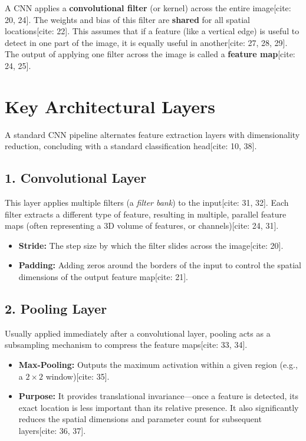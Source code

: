 \begin{definition}
A CNN applies a \textbf{convolutional filter} (or kernel) across the entire image[cite: 20, 24]. The weights and bias of this filter are \textbf{shared} for all spatial locations[cite: 22]. This assumes that if a feature (like a vertical edge) is useful to detect in one part of the image, it is equally useful in another[cite: 27, 28, 29]. The output of applying one filter across the image is called a \textbf{feature map}[cite: 24, 25].
\end{definition}

\section*{Key Architectural Layers}

A standard CNN pipeline alternates feature extraction layers with dimensionality reduction, concluding with a standard classification head[cite: 10, 38].

\subsection*{1. Convolutional Layer}
This layer applies multiple filters (a \textit{filter bank}) to the input[cite: 31, 32]. Each filter extracts a different type of feature, resulting in multiple, parallel feature maps (often representing a 3D volume of features, or channels)[cite: 24, 31].
\begin{itemize}
    \item \textbf{Stride:} The step size by which the filter slides across the image[cite: 20].
    \item \textbf{Padding:} Adding zeros around the borders of the input to control the spatial dimensions of the output feature map[cite: 21].
\end{itemize}

\subsection*{2. Pooling Layer}
Usually applied immediately after a convolutional layer, pooling acts as a subsampling mechanism to compress the feature maps[cite: 33, 34].
\begin{itemize}
    \item \textbf{Max-Pooling:} Outputs the maximum activation within a given region (e.g., a $2 \times 2$ window)[cite: 35].
    \item \textbf{Purpose:} It provides translational invariance—once a feature is detected, its exact location is less important than its relative presence. It also significantly reduces the spatial dimensions and parameter count for subsequent layers[cite: 36, 37].
\end{itemize}


